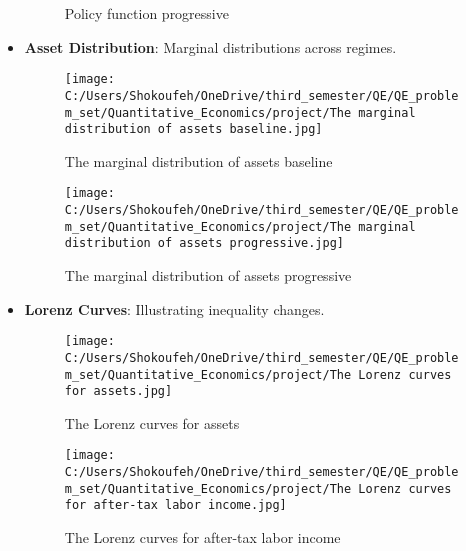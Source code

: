 \documentclass{article}
\begin{document}
\begin{itemize}
\begin{figure}[htbp]
\begin{center}
\begin{minipage}{0.45\textwidth}
    \caption{Policy function progressive}
\end{minipage}
\end{center}
\end{figure}
\FloatBarrier
\item \textbf{Asset Distribution}: Marginal distributions across regimes.\\
\begin{figure}[htbp]
\begin{center}
\begin{minipage}{0.45\textwidth}
    \centering
    \texttt{[image: C:/Users/Shokoufeh/OneDrive/third\_semester/QE/QE\_problem\_set/Quantitative\_Economics/project/The marginal distribution of assets baseline.jpg]}
    \caption{The marginal distribution of assets baseline}
\end{minipage}\hfill
\begin{minipage}{0.45\textwidth}
    \centering
    \texttt{[image: C:/Users/Shokoufeh/OneDrive/third\_semester/QE/QE\_problem\_set/Quantitative\_Economics/project/The marginal distribution of assets progressive.jpg]}
    \caption{The marginal distribution of assets progressive}
\end{minipage}
\end{center}
\end{figure}
\FloatBarrier
\item \textbf{Lorenz Curves}: Illustrating inequality changes.\\
\begin{figure}[htbp]
\begin{center}
\begin{minipage}{0.45\textwidth}
    \centering
    \texttt{[image: C:/Users/Shokoufeh/OneDrive/third\_semester/QE/QE\_problem\_set/Quantitative\_Economics/project/The Lorenz curves for assets.jpg]}
    \caption{The Lorenz curves for assets}
\end{minipage}\hfill
\begin{minipage}{0.45\textwidth}
    \centering
    \texttt{[image: C:/Users/Shokoufeh/OneDrive/third\_semester/QE/QE\_problem\_set/Quantitative\_Economics/project/The Lorenz curves for after-tax labor income.jpg]}
    \caption{The Lorenz curves for after-tax labor income}
\end{minipage}
\end{center}
\end{figure}
\FloatBarrier
\end{itemize}
\end{document}

